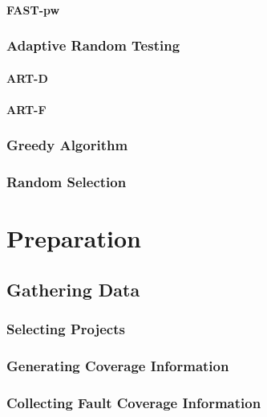 \documentclass[a4paper,10pt]{article}
\begin{document}
\paragraph{FAST-pw}

\subsubsection{Adaptive Random Testing}

\paragraph{ART-D}

\paragraph{ART-F}

\subsubsection{Greedy Algorithm}

\subsubsection{Random Selection}

\section{Preparation}

\subsection{Gathering Data}

\subsubsection{Selecting Projects}


\subsubsection{Generating Coverage Information}


\subsubsection{Collecting Fault Coverage Information}
\end{document}
